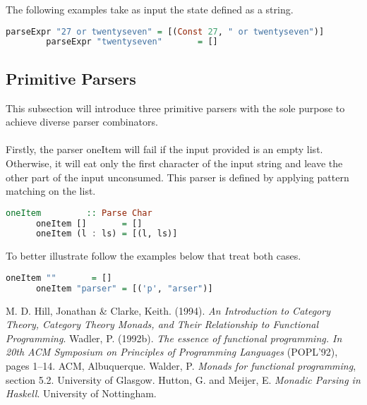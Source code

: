 \documentclass[a4paper, onecolumn]{article}
\begin{document}
    The following examples take as input the state defined as a string. 
    
    \begin{lstlisting}[language=Haskell]
        parseExpr "27 or twentyseven" = [(Const 27, " or twentyseven")] 
        parseExpr "twentyseven"       = []
    \end{lstlisting}
    
    \subsection{Primitive Parsers}
    
    This subsection will introduce three primitive parsers with the sole purpose to achieve diverse parser combinators. \\ \\
    Firstly, the parser oneItem will fail if the input provided is an empty list. Otherwise, it will eat only the first character of the input string and leave the other part of the input unconsumed. This parser is defined by applying pattern matching on the list. 
     
    \begin{tcolorbox}
      \begin{lstlisting}[language=Haskell]
      oneItem         :: Parse Char
      oneItem []       = []
      oneItem (l : ls) = [(l, ls)]
     \end{lstlisting}
    \end{tcolorbox}
    
    To better illustrate follow the examples below that treat both cases.
    
      \begin{lstlisting}[language=Haskell]
      oneItem ""       = []
      oneItem "parser" = [('p', "arser")]
     \end{lstlisting}
    
    
    \begin{thebibliography}{9}
    M. D. Hill, Jonathan & Clarke, Keith. (1994). \textit{An Introduction to Category Theory, Category Theory Monads, and Their Relationship to Functional Programming}.
    Wadler, P. (1992b). \textit{The essence of functional programming. In
    20th ACM Symposium on Principles of Programming Languages}
    (POPL’92), pages 1–14. ACM, Albuquerque.
    Walder, P. \textit{Monads for functional programming}, section 5.2. University of Glasgow. 
    Hutton, G. and Meijer, E. \textit{Monadic Parsing in Haskell}. University of Nottingham.
    \end{thebibliography}
    
\end{document}
